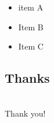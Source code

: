 \documentclass{beamer}
\begin{document}
\begin{frame}
\frametitle{\subsecname}
    \begin{itemize}
      \item
      item A
      \item
      Item B
      \item
      Item C
    \end{itemize}
\end{frame}

\subsection*{Thanks}

\begin{frame}
\frametitle{\subsecname}
  \begin{columns}
  \column{2.5cm}
  \column{5cm}
    \Huge{Thank you!}
  \column{2.5cm}
  \end{columns}
\end{frame}

\end{document}
